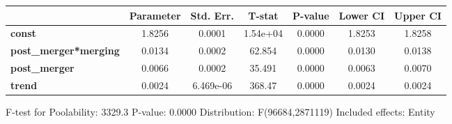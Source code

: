 \documentclass{report}
\begin{document}
\begin{center}
\begin{tabular}{lcccccc}
                              & \textbf{Parameter} & \textbf{Std. Err.} & \textbf{T-stat} & \textbf{P-value} & \textbf{Lower CI} & \textbf{Upper CI}  \\
\midrule
\textbf{const}                &       1.8256       &       0.0001       &     1.54e+04    &      0.0000      &       1.8253      &       1.8258       \\
\textbf{post\_merger*merging} &       0.0134       &       0.0002       &      62.854     &      0.0000      &       0.0130      &       0.0138       \\
\textbf{post\_merger}         &       0.0066       &       0.0002       &      35.491     &      0.0000      &       0.0063      &       0.0070       \\
\textbf{trend}                &       0.0024       &     6.469e-06      &      368.47     &      0.0000      &       0.0024      &       0.0024       \\
\bottomrule
\end{tabular}
\end{center}

F-test for Poolability: 3329.3 \newline
 P-value: 0.0000 \newline
 Distribution: F(96684,2871119) \newline
  \newline
 Included effects: Entity
\end{document}
